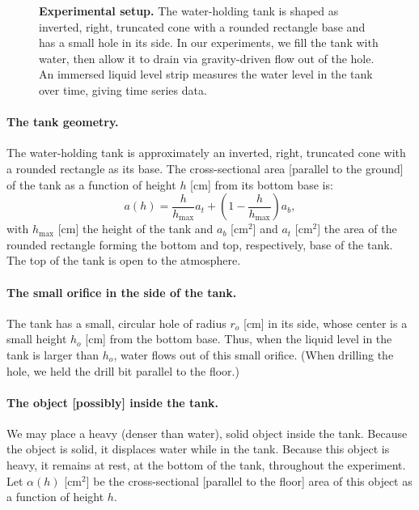 \documentclass[openacc]{rsproca_new}%
\begin{document}
\begin{figure}[h!]
\begin{center}
	\caption{\textbf{Experimental setup.} 
	The water-holding tank is shaped as inverted, right, truncated cone with a rounded rectangle base and has a small hole in its side. In our experiments, we fill the tank with water, then allow it to drain via gravity-driven flow out of the hole. An immersed liquid level strip measures the water level in the tank over time, giving time series data.
	}
	\label{fig:photo_of_tank}
\end{center}
\end{figure}

\paragraph{The tank geometry.} The water-holding tank is approximately an inverted, right, truncated cone with a rounded rectangle as its base. The cross-sectional area [parallel to the ground] of the tank as a function of height $h$ [cm] from its bottom base is:
\begin{equation}
	a(h) = \frac{h}{h_{\text{max}}}a_t + \left(1-\frac{h}{h_{\text{max}}}\right) a_b, \label{eq:a_of_h}
\end{equation}
with $h_{\text{max}}$ [cm] the height of the tank and $a_b$ [cm$^2$] and $a_t$ [cm$^2$] the area of the rounded rectangle forming the bottom and top, respectively, base of the tank.
The top of the tank is open to the atmosphere. 

\paragraph{The small orifice in the side of the tank.} The tank has a small, circular hole of radius $r_o$ [cm] in its side, whose center is a small height $h_o$ [cm] from the bottom base.
Thus, when the liquid level in the tank is larger than $h_o$, water flows out of this small orifice.
(When drilling the hole, we held the drill bit parallel to the floor.) 

\paragraph{The object [possibly] inside the tank.} We may place a heavy (denser than water), solid object inside the tank. Because the object is solid, it displaces water while in the tank. Because this object is heavy, it remains at rest, at the bottom of the tank, throughout the experiment. Let $\alpha(h)$ [cm$^2$] be the cross-sectional [parallel to the floor] area of this object as a function of height $h$.
\end{document}
